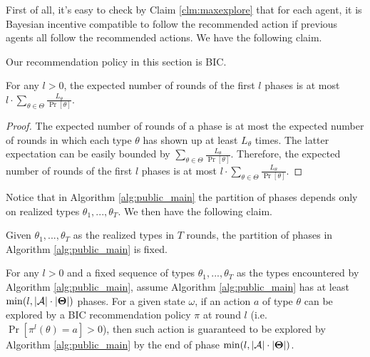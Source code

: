 First of all, it's easy to check by Claim \ref{clm:maxexplore} that for each agent, it is Bayesian incentive compatible to follow the recommended action if previous agents all follow the recommended actions. We have the following claim.
\begin{claim}
\label{clm:public_BIC}
Our recommendation policy in this section is BIC.
\end{claim}

\begin{lemma}
\label{lem:epoch}
For any $l>0$, the expected number of rounds of the first $l$ phases is at most $l \cdot \sum_{\theta\in\varTheta} \frac{L_{\theta}}{\Pr[\theta]}$.
\end{lemma}

\begin{proof}
The expected number of rounds of a phase is at most the expected number of rounds in which each type $\theta$ has shown up at least $L_{\theta}$ times. The latter expectation can be easily bounded by $\sum_{\theta\in\varTheta} \frac{L_{\theta}}{\Pr[\theta]}$. Therefore, the expected number of rounds of the first $l$ phases is at most $l \cdot \sum_{\theta\in\varTheta} \frac{L_{\theta}}{\Pr[\theta]}$.
\end{proof}

Notice that in Algorithm \ref{alg:public_main} the partition of phases depends only on realized types $\theta_1,...,\theta_T$. We then have the following claim.
\begin{claim}
Given $\theta_1,...,\theta_T$ as the realized types in $T$ rounds, the partition of phases in Algorithm \ref{alg:public_main} is fixed.
\end{claim}

\begin{lemma}
\label{lem:exp_public}
For any $l>0$ and a fixed sequence of types $\theta_1,...,\theta_T$ as the types encountered by Algorithm \ref{alg:public_main}, assume Algorithm \ref{alg:public_main} has at least $\min(l, |\mathcal{A}|\cdot |\bold{\Theta}|)$ phases.
For a given state $\omega$, if an action $a$ of type $\theta$ can be explored by a BIC recommendation policy $\pi$ at round $l$ (i.e. $ \Pr[\pi^l(\theta)= a]> 0$), then such action is guaranteed to be explored by Algorithm \ref{alg:public_main} by the end of phase $\min(l, |\mathcal{A}|\cdot |\bold{\Theta}|)$.
\end{lemma}

